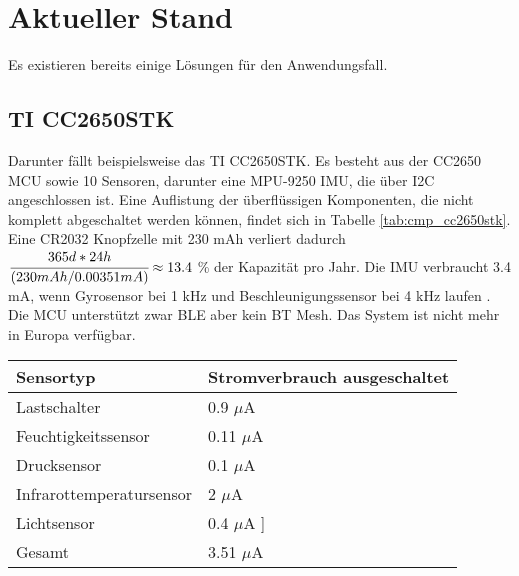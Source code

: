 

\chapter{Aktueller Stand}
Es existieren bereits einige Lösungen für den Anwendungsfall.

\section{TI CC2650STK}
Darunter fällt beispielsweise das TI CC2650STK.
Es besteht aus der CC2650 MCU sowie 10 Sensoren, darunter eine MPU-9250 IMU, die über I2C angeschlossen ist.
Eine Auflistung der überflüssigen Komponenten, die nicht komplett abgeschaltet werden können, findet sich in Tabelle \ref{tab:cmp_cc2650stk}.
Eine CR2032 Knopfzelle mit 230 mAh verliert dadurch $\cfrac{365d*24h}{(230mAh/0.00351mA)} \approx 13.4$ \% der Kapazität pro Jahr.
Die IMU verbraucht 3.4 mA, wenn Gyrosensor bei 1 kHz und Beschleunigungssensor bei 4 kHz laufen \cite{datasheet_mpu9250}.
Die MCU unterstützt zwar BLE aber kein BT Mesh.
Das System ist nicht mehr in Europa verfügbar. \cite{site_cc2650stk}

\begin{minipage}{\linewidth}
	\label{tab:cmp_cc2650stk}
	\begin{tabularx}{\linewidth}{X|X}
    Sensortyp & Stromverbrauch ausgeschaltet\\
    \hline
    Lastschalter & 0.9 $\mu$A \cite{datasheet_tps2291}\\
    Feuchtigkeitssensor & 0.11 $\mu$A \cite{datasheet_hdc1000}\\
    Drucksensor & 0.1 $\mu$A \cite{datasheet_bmp280}\\
    Infrarottemperatursensor & 2 $\mu$A \cite{site_tmp007}\\
    Lichtsensor & 0.4 $\mu$A \cite{datasheet_opt3001}]\\
    \hline
    Gesamt & 3.51 $\mu$A\\
  \end{tabularx}
\end{minipage}

